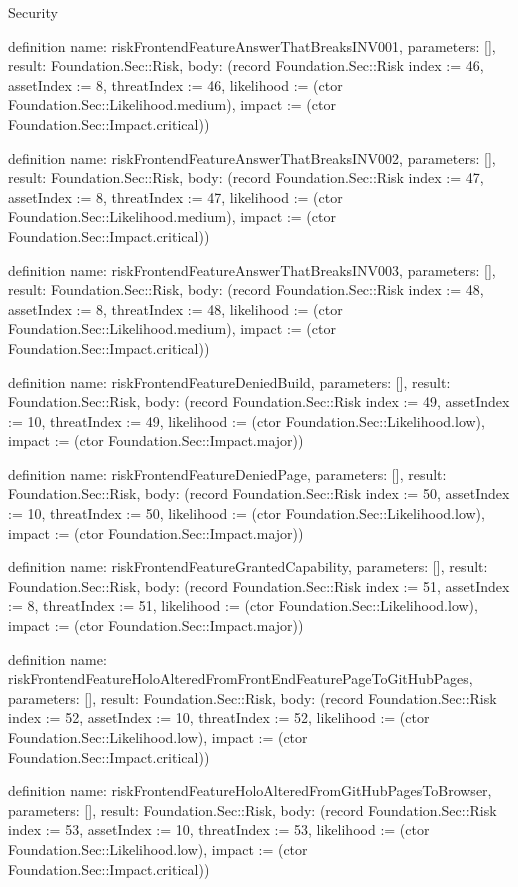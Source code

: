\begin{lexlean}{Security}
\begin{semanticmodule}
definition{
  name: riskFrontendFeatureAnswerThatBreaksINV001,
  parameters: [],
  result: Foundation.Sec::Risk,
  body: (record Foundation.Sec::Risk {index := 46, assetIndex := 8, threatIndex := 46, likelihood := (ctor Foundation.Sec::Likelihood.medium), impact := (ctor Foundation.Sec::Impact.critical)})
}

definition{
  name: riskFrontendFeatureAnswerThatBreaksINV002,
  parameters: [],
  result: Foundation.Sec::Risk,
  body: (record Foundation.Sec::Risk {index := 47, assetIndex := 8, threatIndex := 47, likelihood := (ctor Foundation.Sec::Likelihood.medium), impact := (ctor Foundation.Sec::Impact.critical)})
}

definition{
  name: riskFrontendFeatureAnswerThatBreaksINV003,
  parameters: [],
  result: Foundation.Sec::Risk,
  body: (record Foundation.Sec::Risk {index := 48, assetIndex := 8, threatIndex := 48, likelihood := (ctor Foundation.Sec::Likelihood.medium), impact := (ctor Foundation.Sec::Impact.critical)})
}

definition{
  name: riskFrontendFeatureDeniedBuild,
  parameters: [],
  result: Foundation.Sec::Risk,
  body: (record Foundation.Sec::Risk {index := 49, assetIndex := 10, threatIndex := 49, likelihood := (ctor Foundation.Sec::Likelihood.low), impact := (ctor Foundation.Sec::Impact.major)})
}

definition{
  name: riskFrontendFeatureDeniedPage,
  parameters: [],
  result: Foundation.Sec::Risk,
  body: (record Foundation.Sec::Risk {index := 50, assetIndex := 10, threatIndex := 50, likelihood := (ctor Foundation.Sec::Likelihood.low), impact := (ctor Foundation.Sec::Impact.major)})
}

definition{
  name: riskFrontendFeatureGrantedCapability,
  parameters: [],
  result: Foundation.Sec::Risk,
  body: (record Foundation.Sec::Risk {index := 51, assetIndex := 8, threatIndex := 51, likelihood := (ctor Foundation.Sec::Likelihood.low), impact := (ctor Foundation.Sec::Impact.major)})
}

definition{
  name: riskFrontendFeatureHoloAlteredFromFrontEndFeaturePageToGitHubPages,
  parameters: [],
  result: Foundation.Sec::Risk,
  body: (record Foundation.Sec::Risk {index := 52, assetIndex := 10, threatIndex := 52, likelihood := (ctor Foundation.Sec::Likelihood.low), impact := (ctor Foundation.Sec::Impact.critical)})
}

definition{
  name: riskFrontendFeatureHoloAlteredFromGitHubPagesToBrowser,
  parameters: [],
  result: Foundation.Sec::Risk,
  body: (record Foundation.Sec::Risk {index := 53, assetIndex := 10, threatIndex := 53, likelihood := (ctor Foundation.Sec::Likelihood.low), impact := (ctor Foundation.Sec::Impact.critical)})
}


\end{semanticmodule}
\end{lexlean}
